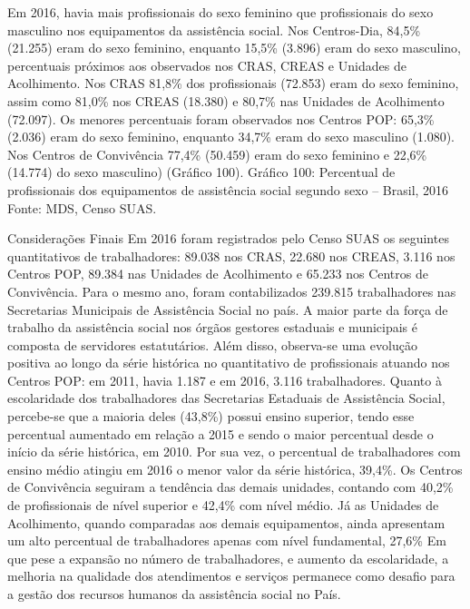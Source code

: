 \documentclass[
  brazilian]{report}
\begin{document}
Em 2016, havia mais profissionais do sexo feminino que profissionais do
sexo masculino nos equipamentos da assistência social. Nos Centros-Dia,
84,5\% (21.255) eram do sexo feminino, enquanto 15,5\% (3.896) eram do
sexo masculino, percentuais próximos aos observados nos CRAS, CREAS e
Unidades de Acolhimento. Nos CRAS 81,8\% dos profissionais (72.853) eram
do sexo feminino, assim como 81,0\% nos CREAS (18.380) e 80,7\% nas
Unidades de Acolhimento (72.097). Os menores percentuais foram
observados nos Centros POP: 65,3\% (2.036) eram do sexo feminino,
enquanto 34,7\% eram do sexo masculino (1.080). Nos Centros de
Convivência 77,4\% (50.459) eram do sexo feminino e 22,6\% (14.774) do
sexo masculino) (Gráfico 100). Gráfico 100: Percentual de profissionais
dos equipamentos de assistência social segundo sexo -- Brasil, 2016
Fonte: MDS, Censo SUAS.

Considerações Finais Em 2016 foram registrados pelo Censo SUAS os
seguintes quantitativos de trabalhadores: 89.038 nos CRAS, 22.680 nos
CREAS, 3.116 nos Centros POP, 89.384 nas Unidades de Acolhimento e
65.233 nos Centros de Convivência. Para o mesmo ano, foram
contabilizados 239.815 trabalhadores nas Secretarias Municipais de
Assistência Social no país. A maior parte da força de trabalho da
assistência social nos órgãos gestores estaduais e municipais é composta
de servidores estatutários. Além disso, observa-se uma evolução positiva
ao longo da série histórica no quantitativo de profissionais atuando nos
Centros POP: em 2011, havia 1.187 e em 2016, 3.116 trabalhadores. Quanto
à escolaridade dos trabalhadores das Secretarias Estaduais de
Assistência Social, percebe-se que a maioria deles (43,8\%) possui
ensino superior, tendo esse percentual aumentado em relação a 2015 e
sendo o maior percentual desde o início da série histórica, em 2010. Por
sua vez, o percentual de trabalhadores com ensino médio atingiu em 2016
o menor valor da série histórica, 39,4\%. Os Centros de Convivência
seguiram a tendência das demais unidades, contando com 40,2\% de
profissionais de nível superior e 42,4\% com nível médio. Já as Unidades
de Acolhimento, quando comparadas aos demais equipamentos, ainda
apresentam um alto percentual de trabalhadores apenas com nível
fundamental, 27,6\% Em que pese a expansão no número de trabalhadores, e
aumento da escolaridade, a melhoria na qualidade dos atendimentos e
serviços permanece como desafio para a gestão dos recursos humanos da
assistência social no País.
\end{document}
